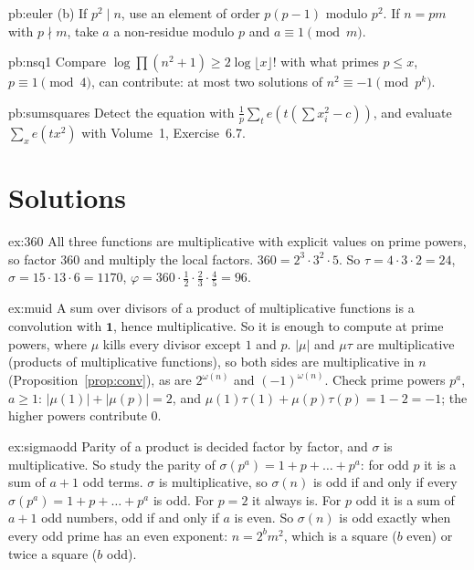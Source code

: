 \begin{hint}{pb:euler}
(b) If $p^2\mid n$, use an element of order $p(p-1)$ modulo $p^2$. If $n=pm$ with $p\nmid m$, take $a$ a non-residue modulo $p$
and $a\equiv1\pmod m$.
\end{hint}

\begin{hint}{pb:nsq1}
Compare $\log\prod(n^2+1)\ge2\log\lfloor x\rfloor!$ with what primes $p\le x$, $p\equiv1\pmod4$, can contribute: at most two
solutions of $n^2\equiv-1\pmod{p^k}$.
\end{hint}

\begin{hint}{pb:sumsquares}
Detect the equation with $\frac1p\sum_te(t(\sum x_i^2-c))$, and evaluate $\sum_xe(tx^2)$ with Volume~1, Exercise~6.7.
\end{hint}

\section{Solutions}

\begin{solution}{ex:360}
\idea All three functions are multiplicative with explicit values on prime powers, so factor $360$ and multiply the local factors.
\writeup $360=2^3\cdot3^2\cdot5$. So $\tau=4\cdot3\cdot2=24$, $\sigma=15\cdot13\cdot6=1170$, $\varphi=360\cdot\frac12\cdot\frac23\cdot\frac45=96$.
\end{solution}

\begin{solution}{ex:muid}
\idea A sum over divisors of a product of multiplicative functions is a convolution with $\mathbf 1$, hence multiplicative. So it is enough to compute at prime powers, where $\mu$ kills every divisor except $1$ and $p$.
\writeup $|\mu|$ and $\mu\tau$ are multiplicative (products of multiplicative functions), so both sides are multiplicative in $n$ (Proposition~\ref{prop:conv}), as are $2^{\omega(n)}$ and $(-1)^{\omega(n)}$. Check prime powers $p^a$, $a\ge1$: $|\mu(1)|+|\mu(p)|=2$, and $\mu(1)\tau(1)+\mu(p)\tau(p)=1-2=-1$; the higher powers contribute $0$.
\end{solution}

\begin{solution}{ex:sigmaodd}
\idea Parity of a product is decided factor by factor, and $\sigma$ is multiplicative. So study the parity of $\sigma(p^a)=1+p+\dots+p^a$: for odd $p$ it is a sum of $a+1$ odd terms.
\writeup $\sigma$ is multiplicative, so $\sigma(n)$ is odd if and only if every $\sigma(p^a)=1+p+\dots+p^a$ is odd. For $p=2$ it always is. For $p$ odd it is a sum of $a+1$ odd numbers, odd if and only if $a$ is even. So $\sigma(n)$ is odd exactly when every odd prime has an even exponent: $n=2^bm^2$, which is a square ($b$ even) or twice a square ($b$ odd).
\end{solution}

